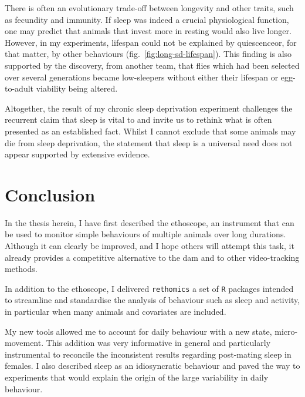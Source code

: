 There is often an evolutionary trade-off between longevity and other traits, such as fecundity\cite{flatt_juvenile_2007} and immunity\cite{lochmiller_trade-offs_2000,libert_trade-offs_2006}.
If sleep was indeed a crucial physiological function, one may predict that animals that invest more in resting would also live longer.
However, in my experiments, lifespan could not be explained by quiescence\emd{}or, for that matter, by other behaviours (fig.~\ref{fig:long-sd-lifespan}).
This finding is also supported by the discovery, from another team, that flies which had been selected over several generations became low-sleepers without either their lifespan or egg-to-adult viability being altered\cite{harbison_selection_2017}.


Altogether, the result of my chronic sleep deprivation experiment challenges the recurrent claim that sleep is vital to \droso{} and invite us to rethink what is often presented as an established fact. 
Whilst I cannot exclude that some animals may die from sleep deprivation, 
the statement that sleep is a universal need does not appear supported by extensive evidence.

\newpage
\section{Conclusion}


In the thesis herein, I have first described the ethoscope, an instrument that can be used to monitor simple behaviours of multiple animals over long durations. 
Although it can clearly be improved, and I hope others will attempt this task, it already provides a competitive alternative to the \acrfull{dam} and to other video-tracking methods.

In addition to the ethoscope, I delivered \texttt{rethomics} a set of \texttt{R} packages intended to streamline and standardise the analysis of behaviour such as sleep and activity, in particular when many animals and covariates are included.

My new tools allowed me to account for daily behaviour with a new state, micro-movement.
This addition was very informative in general and particularly instrumental to reconcile the inconsistent results regarding post-mating sleep in females. 
I also described sleep as an idiosyncratic behaviour and paved the way to experiments that would explain the origin of the large variability in daily behaviour.
 
